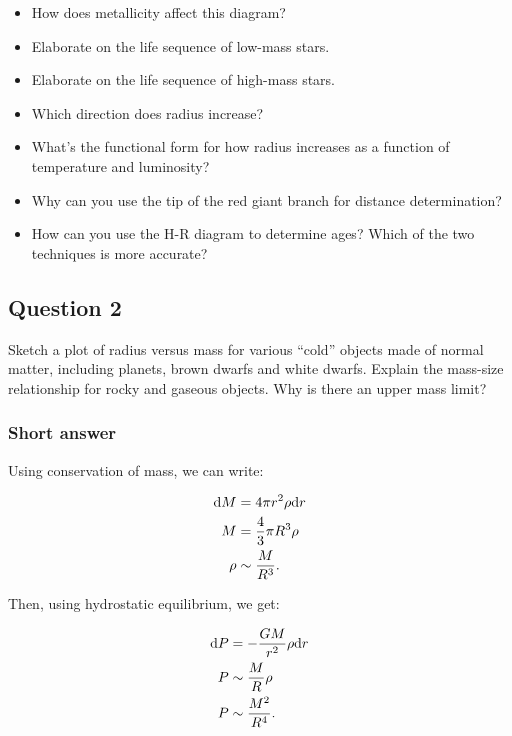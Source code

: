 \documentclass[a4paper,10pt]{article}
\begin{document}
\begin{itemize}
    \item How does metallicity affect this diagram?
    \item Elaborate on the life sequence of low-mass stars.
    \item Elaborate on the life sequence of high-mass stars.
    \item Which direction does radius increase?
    \item What's the functional form for how radius increases as a function of temperature and luminosity?
    \item Why can you use the tip of the red giant branch for distance determination?
    \item How can you use the H-R diagram to determine ages? Which of the two techniques is more accurate?
\end{itemize}


\newpage
\subsection{Question 2}

Sketch a plot of radius versus mass for various ``cold'' objects made of normal matter, including planets, brown dwarfs and white dwarfs. Explain the mass-size relationship for rocky and
gaseous objects. Why is there an upper mass limit?

\subsubsection{Short answer}

Using conservation of mass, we can write:

\begin{align*}
    {\rm d}M &= 4\pi r^2\rho{\rm d}r \\
           M &= \frac{4}{3}\pi R^3\rho \\
        \rho &\sim \frac{M}{R^3}.
\end{align*}

{\noindent}Then, using hydrostatic equilibrium, we get:

\begin{align*}
    {\rm d}P &= -\frac{GM}{r^2}\rho{\rm d}r \\
           P &\sim \frac{M}{R}\rho \\
           P &\sim \frac{M^2}{R^4}.
\end{align*}
\end{document}

